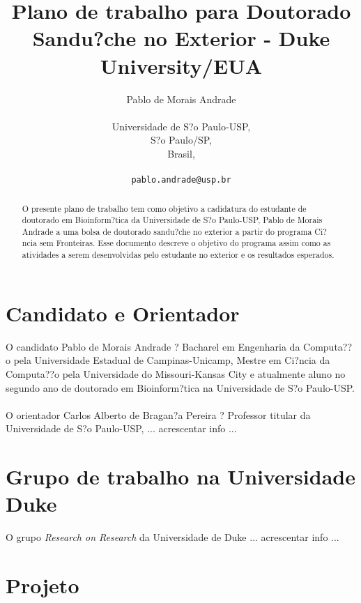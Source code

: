 \documentclass{article}
\title{Plano de trabalho para Doutorado Sandu?che no Exterior - Duke University/EUA}
\begin{document}
\author{Pablo de Morais Andrade\\\\
		Universidade de S?o Paulo-USP,\\
  		S?o Paulo/SP,\\
  		Brasil,\\\\
  \texttt{pablo.andrade@usp.br}}
\maketitle

\begin{abstract}
O presente plano de trabalho tem como objetivo a cadidatura do estudante de doutorado em Bioinform?tica da Universidade de S?o Paulo-USP, Pablo de Morais Andrade a uma bolsa de doutorado sandu?che no exterior a partir do programa Ci?ncia sem Fronteiras. Esse documento descreve o objetivo do programa assim como as atividades a serem desenvolvidas pelo estudante no exterior e os resultados esperados.
\end{abstract}

\section{ \label{sec:projeto} Candidato e Orientador}
O candidato Pablo de Morais Andrade ? Bacharel em Engenharia da Computa??o pela Universidade Estadual de Campinas-Unicamp, Mestre em Ci?ncia da Computa??o pela Universidade do Missouri-Kansas City e atualmente aluno no segundo ano de doutorado em Bioinform?tica na Universidade de S?o Paulo-USP.\\

\\
O orientador Carlos Alberto de Bragan?a Pereira ? Professor titular da Universidade de S?o Paulo-USP, {\color{red} ... acrescentar info ...}

\section{ \label{sec:duke} Grupo de trabalho na Universidade Duke}
O grupo \textit{Research on Research} da Universidade de Duke {\color{red} ... acrescentar info ...}


\section{ \label{sec:projeto} Projeto}
\end{document}
